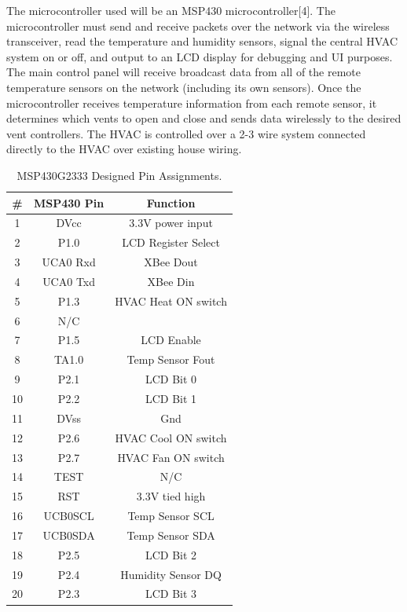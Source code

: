The microcontroller used will be an MSP430 microcontroller[4]. The microcontroller must send and receive packets over the network via the wireless transceiver, read the temperature and humidity sensors, signal the central HVAC system on or off, and output to an LCD display for debugging and UI purposes. The main control panel will receive broadcast data from all of the remote temperature sensors on the network (including its own sensors). Once the microcontroller receives temperature information from each remote sensor, it determines which vents to open and close and sends data wirelessly to the desired vent controllers. The HVAC is controlled over a 2-3 wire system connected directly to the HVAC over existing house wiring.
\begin{table}[htbp]
\centering
\caption{MSP430G2333 Designed Pin Assignments.}
\begin{tabular}{|c|c|c|}
\hline
\textbf{\#} & \textbf{MSP430 Pin} & \textbf{Function} \bigstrut\\
\hline
\hline
1 & DVcc & 3.3V power input \bigstrut\\
\hline
2 & P1.0 & LCD Register Select \bigstrut\\
\hline
3 & UCA0 Rxd & XBee Dout \bigstrut\\
\hline
4 & UCA0 Txd & XBee Din \bigstrut\\
\hline
5 & P1.3 & HVAC Heat ON switch \bigstrut\\
\hline
6 & N/C \bigstrut\\
\hline
7 & P1.5 & LCD Enable \bigstrut\\
\hline
8 & TA1.0 & Temp Sensor Fout \bigstrut\\
\hline
9 & P2.1 & LCD Bit 0 \bigstrut\\
\hline
10 & P2.2 & LCD Bit 1 \bigstrut\\
\hline
11 & DVss & Gnd \bigstrut\\
\hline
12 & P2.6 & HVAC Cool ON switch \bigstrut\\
\hline
13 & P2.7 & HVAC Fan ON switch \bigstrut\\
\hline
14 & TEST & N/C \bigstrut\\
\hline
15 & RST & 3.3V tied high \bigstrut\\
\hline
16 & UCB0SCL & Temp Sensor SCL \bigstrut\\
\hline
17 & UCB0SDA & Temp Sensor SDA \bigstrut\\
\hline
18 & P2.5 & LCD Bit 2 \bigstrut\\
\hline
19 & P2.4 & Humidity Sensor DQ \bigstrut\\
\hline
20 & P2.3 & LCD Bit 3 \bigstrut\\
\hline
\end{tabular}%
\label{tab:msp_inout}%
\end{table}%

